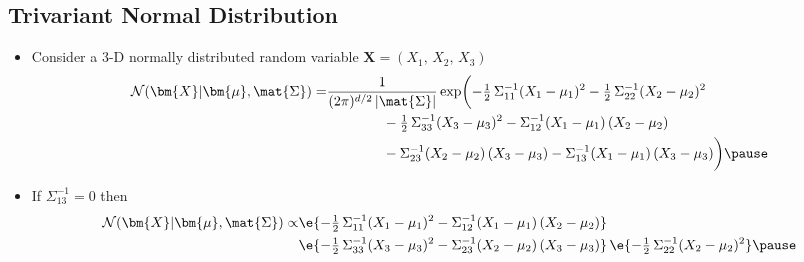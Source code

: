 
\begin{slide}
\section{Trivariant Normal Distribution}

\begin{PauseHighLight}
  \begin{itemize}
  \item Consider a 3-D normally distributed random variable $\bm{X} =
    (X_1,\, X_2,\, X_3)$
    {\small
    \begin{align*}
      \mathcal{N}(\bm{X}|\bm{\mu}, \mat{\Sigma}) =& 
      \frac{1}{(2\pi)^{d/2}\,|\mat{\Sigma}|}
      \exp\biggl(-\tfrac{1}{2}\,\Sigma^{-1}_{11} (X_1-\mu_1)^2 
      -\tfrac{1}{2}\,\Sigma^{-1}_{22} (X_2-\mu_2)^2 \\
      &\hspace{4em}  -\tfrac{1}{2}\,\Sigma^{-1}_{33} (X_3-\mu_3)^2 
      - \Sigma^{-1}_{12} (X_1-\mu_1)\,(X_2-\mu_2) \\
      &\hspace{4em} - \Sigma^{-1}_{23} (X_2-\mu_2)\,(X_3-\mu_3)
      - \Sigma^{-1}_{13} (X_1-\mu_1)\,(X_3-\mu_3)\biggr)\pause
    \end{align*}}
  \item If $\Sigma^{-1}_{13}=0$ then
    \begin{align*}
      \mathcal{N}(\bm{X}|\bm{\mu}, \mat{\Sigma})
      \propto& \e{-\tfrac{1}{2}\,\Sigma^{-1}_{11}
      (X_1-\mu_1)^2 - \Sigma^{-1}_{12} (X_1-\mu_1)\,(X_2-\mu_2)} \\
      & \e{-\tfrac{1}{2}\,\Sigma^{-1}_{33}
      (X_3-\mu_3)^2 - \Sigma^{-1}_{23} (X_2-\mu_2)\,(X_3-\mu_3)} 
      \, \e{-\tfrac{1}{2}\,\Sigma^{-1}_{22} (X_2-\mu_2)^2}\pause
    \end{align*}
  \end{itemize}
\end{PauseHighLight}

\end{slide}


